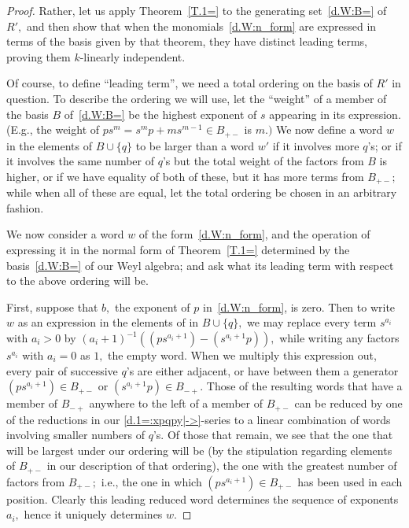 \documentclass{amsart}
\begin{document}
\begin{proof}
Rather, let us apply Theorem~\ref{T.1=} to
the generating set~\eqref{d.W:B=} of $R',$ and then
show that when the monomials~\eqref{d.W:n_form} are
expressed in terms of the basis given by
that theorem, they have distinct leading
terms, proving them $\!k\!$-linearly independent.

Of course, to define ``leading term'', we need a total ordering
on the basis of $R'$ in question.
To describe the ordering we will use,
let the ``weight'' of a member of
the basis $B$ of~\eqref{d.W:B=} be the highest exponent of $s$
appearing in its expression.
(E.g., the weight of $p s^m = s^m p + m s^{m-1}\in B_{+-}$ is $m.)$
We now define a word $w$
in the elements of $B\cup\{q\}$ to be larger than a word $w'$ if
it involves more $\!q\!$'s; or if it involves the same number
of $\!q\!$'s but the total weight of the factors from $B$ is
higher, or if we have equality of both of these, but it has
more terms from $B_{+-};$ while when all of these are equal, let
the total ordering be chosen in an arbitrary fashion.

We now consider a word $w$ of the form~\eqref{d.W:n_form}, and
the operation of expressing it in the normal form
of Theorem~\ref{T.1=} determined by the basis~\eqref{d.W:B=} of
our Weyl algebra; and ask what its leading term with respect to
the above ordering will be.

First, suppose that $b,$ the exponent of $p$ in~\eqref{d.W:n_form},
is zero.
Then to write $w$ as an expression in the elements of in $B\cup\{q\},$
we may replace every term $s^{a_i}$ with $a_i>0$ by
$(a_i+1)^{-1}((ps^{a_i+1}) - (s^{a_i+1}p)),$ while writing any
factors $s^{a_i}$ with $a_i=0$ as $1,$ the empty word.
When we multiply this expression out, every pair of successive
$\!q\!$'s are either adjacent, or have between them a generator
$(ps^{a_i+1})\in B_{+-}$ or $(s^{a_i+1}p)\in B_{-+}.$
Those of the resulting words that have a member of $B_{-+}$
anywhere to the left of a member of $B_{+-}$ can be reduced by
one of the reductions in our \eqref{d.1=:xpqpy|->}-series
to a linear combination of words involving smaller numbers of $\!q\!$'s.
Of those that remain, we see that the one that will be largest
under our ordering will be (by the stipulation
regarding elements of $B_{+-}$ in our description
of that ordering), the one with the greatest
number of factors from $B_{+-};$ i.e., the one in which
$(ps^{a_i+1})\in B_{+-}$ has been used in each position.
Clearly this leading reduced word determines the sequence
of exponents $a_i,$ hence it uniquely determines $w.$


\end{proof}
\end{document}
